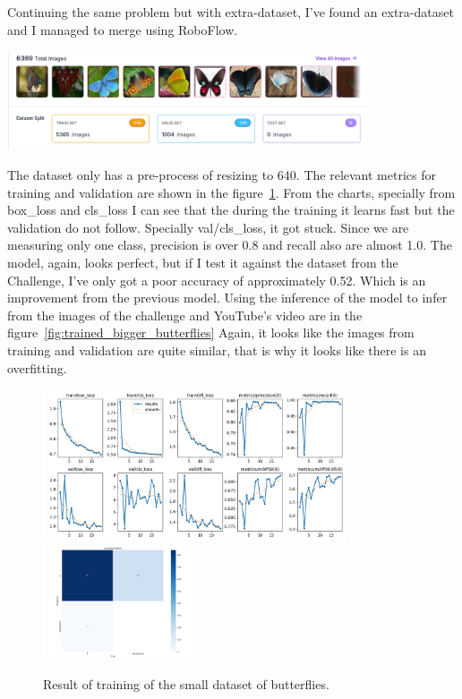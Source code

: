 \documentclass{cpsc202}
\begin{document}
    \newpage
    Continuing the same problem but with extra-dataset, I've found an extra-dataset and I managed to merge using RoboFlow.
    \begin{center}
        \includegraphics[width=0.8\textwidth]{trained_bigger_butterflies/dataset_enhanced}
    \end{center}
    The dataset only has a pre-process of resizing to 640.
    The relevant metrics for training and validation are shown in the figure~\ref{fig:results-big}.
    From the charts, specially from box\_loss and cls\_loss I can see that the during the training it learns fast but the validation do not follow.
    Specially val/cls\_loss, it got stuck.
    Since we are measuring only one class, precision is over 0.8 and recall also are almost 1.0.
    The model, again,  looks perfect, but if I test it against the dataset from the Challenge, I've only got a poor accuracy of approximately 0.52.
    Which is an improvement from the previous model.
    Using the inference of the model to infer from the images of the challenge and YouTube's video are in the figure~\ref{fig:trained_bigger_butterflies}
    Again, it looks like the images from training and validation are quite similar, that is why it looks like there is an overfitting.
    \begin{figure}
        \begin{center}
            \includegraphics[width=0.8\textwidth]{trained_bigger_butterflies/results}
            \includegraphics[width=0.4\textwidth]{trained_bigger_butterflies/confusion_matrix}
        \end{center}
        \caption{Result of training of the small dataset of butterflies.}
        \label{fig:results-big}
    \end{figure}
\end{document}
